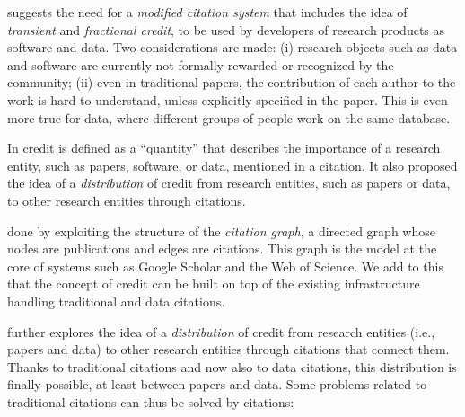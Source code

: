 \citet{transitiveCreditKatz2014} suggests the need for a \emph{modified citation system} that includes the idea of \emph{transient} and \emph{fractional credit}, to be used by developers of research products as software and data.
Two considerations are made: (i) research objects such as data and software are currently not formally rewarded or recognized by the community; 
(ii) even in traditional papers, the contribution of each author to the work is hard to understand, unless explicitly specified in the paper. 
This is even more true for data, where different groups of people work on the same database.

In \citep{transitiveCreditKatz2014} credit is defined as a ``quantity'' that describes the importance of a research entity, such as papers, software, or data, mentioned in a citation. 
It also proposed the idea of a \emph{distribution} of credit from research entities, such as papers or data, to other research entities through citations. 

 done by exploiting the structure of the \emph{citation graph}, a directed graph whose nodes are publications and edges are citations.
This graph is the model at the core of systems such as Google Scholar and the Web of Science.
We add to this that the concept of credit can be built on top of the existing infrastructure handling traditional and data citations.

\citet{transitiveCreditKatz2014} further explores the idea of a \emph{distribution} of credit from research entities (i.e., papers and data) to other research entities through citations that connect them. 
Thanks to traditional citations and now also to data citations, this distribution is finally possible, at least between papers and data. 
Some problems related to traditional citations can thus be solved by citations:

